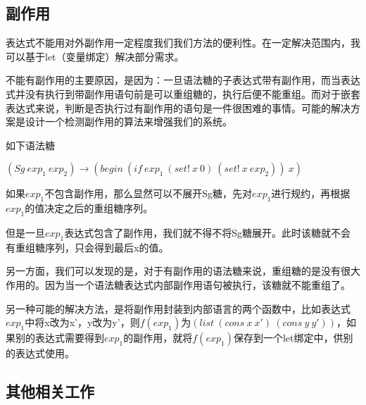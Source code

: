 \label{mark:side}\subsection{副作用}

表达式不能用对外副作用一定程度我们我们方法的便利性。在一定解决范围内，我可以基于let（变量绑定）解决部分需求。

不能有副作用的主要原因，是因为：一旦语法糖的子表达式带有副作用，而当表达式并没有执行到带副作用语句前是可以重组糖的，执行后便不能重组。而对于嵌套表达式来说，判断是否执行过有副作用的语句是一件很困难的事情。可能的解决方案是设计一个检测副作用的算法来增强我们的系统。

如下语法糖

$(Sg~exp_{1}~exp_{2})→(begin~(if~exp_{1}~(set!~x~0)~(set!~x~exp_{2}))~x)$

如果$exp_{1}$不包含副作用，那么显然可以不展开Sg糖，先对$exp_{1}$进行规约，再根据$exp_{1}$的值决定之后的重组糖序列。

但是一旦$exp_{1}$表达式包含了副作用，我们就不得不将Sg糖展开。此时该糖就不会有重组糖序列，只会得到最后x的值。

另一方面，我们可以发现的是，对于有副作用的语法糖来说，重组糖的是没有很大作用的。因为当一个语法糖表达式内部副作用语句被执行，该糖就不能重组了。

另一种可能的解决方法，是将副作用封装到内部语言的两个函数中，比如表达式$exp_{1}$中将x改为x'，y改为y'，则$f(exp_{1})$为$(list~(cons~x~x')~(cons~y~y'))$，如果别的表达式需要得到$exp_{1}$的副作用，就将$f(exp_{1})$保存到一个let绑定中，供别的表达式使用。

\subsection{其他相关工作}
